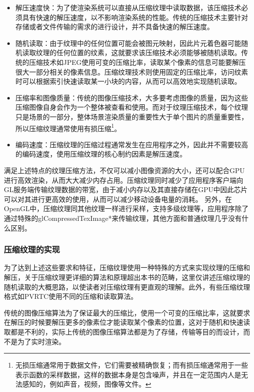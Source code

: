 \begin{itemize}
	\item 解压速度快：为了使渲染系统可以直接从压缩纹理中读取数据，该压缩技术必须具有快速的解压速度，以不影响渲染系统的性能。传统的压缩技术主要针对存储或者文件传输的需求的进行设计，并不具备快速的解压速度。
	\item 随机读取：由于纹理中的任何位置可能会被图元映射，因此片元着色器可能随机读取纹理的任何位置的纹素，这就要求该压缩技术必须能够被随机读取。传统的压缩技术如JPEG使用可变的压缩比率，读取某个像素的信息可能要解压很大一部分相关的像素信息。压缩纹理技术则使用固定的压缩比率，访问纹素时可以根据索引快速读取某一小块的内容，从而可以高效地实现随机读取。
	\item 压缩率和图像质量：传统的图像压缩技术，大多要考虑图像的质量，因为这些压缩图像自身会作为一个整体被查看和使用。而对于纹理压缩技术，每个纹理只是场景的一部分，整体场景渲染质量的重要性大于单个图片的质量重要性，所以压缩纹理通常使用有损压缩\footnote{无损压缩通常用于数据文件，它们需要被精确恢复；而有损压缩通常用于一些表示函数的采样数据，这样的数据本身是包含噪声，并且在一定范围内人是无法感知的，例如声音，视频，图像等文件。}。
	\item 编码速度：压缩纹理的压缩过程通常发生在应用程序之外，因此并不需要较高的编码速度，使用压缩纹理的核心制约因素是解压速度。

\end{itemize}

满足上述特点的纹理压缩方法，不仅可以减小图像资源的大小，还可以配合GPU进行高效渲染，从而大大减少内存占用。压缩纹理同时减少了应用程序客户端向GL服务端传输纹理数据的带宽，由于减小内存以及其直接存储在GPU中因此芯片可以对其进行更高效的使用，从而可以减少移动设备电量的消耗。 另外，在OpenGL中，压缩纹理同其他纹理一样进行采样，支持多级纹理等，应用程序除了通过特殊的glCompressedTexImage*来传输纹理，其他方面和普通纹理几乎没有什么区别。



\subsubsection{压缩纹理的实现}
为了达到上述这些要求和特征，压缩纹理使用一种特殊的方式来实现纹理的压缩和解压，关于压缩纹理更详细的算法和原理超出本书的范畴，这里仅讲述压缩纹理的随机读取的大概思路，以使读者对压缩纹理有更直观的理解。此外，有些压缩纹理格式如PVRTC使用不同的压缩和读取算法。

传统的图像压缩算法为了保证最大的压缩比，使用一个可变的压缩比率，这就要求在解压的时候要解压更多的像素位才能读取某个像素的位置，这对于随机和快速读取都是不利的，实际上传统的图像压缩算法都是为了存储，传输等目的而设计，而不是为了实时渲染。

